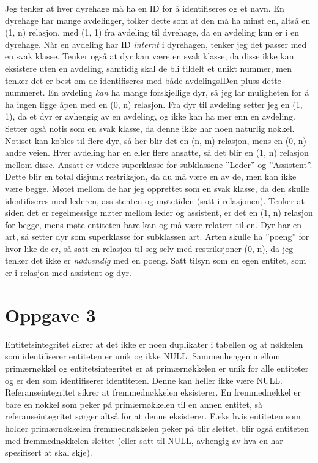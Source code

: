 \documentclass[12pt,a4paper]{article}
\begin{document}
	Jeg tenker at hver dyrehage må ha en ID for å identifiseres og et navn. En dyrehage har mange avdelinger, tolker dette som at den må ha minst en, altså en (1, n) relasjon, med (1, 1) fra avdeling til dyrehage, da en avdeling kun er i en dyrehage. Når en avdeling har ID \textit{internt} i dyrehagen, tenker jeg det passer med en svak klasse. Tenker også at dyr kan være en svak klasse, da disse ikke kan eksistere uten en avdeling, samtidig skal de bli tildelt et unikt nummer, men tenker det er best om de identifiseres med både avdelingsIDen pluss dette nummeret. En avdeling \textit{kan} ha mange forskjellige dyr, så jeg lar muligheten for å ha ingen ligge åpen med en (0, n) relasjon. Fra dyr til avdeling setter jeg en (1, 1), da et dyr er avhengig av en avdeling, og ikke kan ha mer enn en avdeling. Setter også notis som en svak klasse, da denne ikke har noen naturlig nøkkel. Notiset kan kobles til flere dyr, så her blir det en (n, m) relasjon, mens en (0, n) andre veien. Hver avdeling har en eller flere ansatte, så det blir en (1, n) relasjon mellom disse. Ansatt er videre superklasse for subklassene ''Leder'' og ''Assistent''. Dette blir en total disjunk restriksjon, da du må være en av de, men kan ikke være begge. Møtet mellom de har jeg opprettet som en svak klasse, da den skulle identifiseres med lederen, assistenten og møtetiden (satt i relasjonen). Tenker at siden det er regelmessige møter mellom leder og assistent, er det en (1, n) relasjon for begge, mens møte-entiteten bare kan og må være relatert til en. Dyr har en art, så setter dyr som superklasse for subklassen art. Arten skulle ha ''poeng'' for hvor like de er, så satt en relasjon til seg selv med restriksjoner (0, n), da jeg tenker det ikke er \textit{nødvendig} med en poeng. Satt tilsyn som en egen entitet, som er i relasjon med assistent og dyr. 
	
	\section{Oppgave 3}
		Entitetsintegritet sikrer at det ikke er noen duplikater i tabellen og at nøkkelen som identifiserer entiteten er unik og ikke NULL. Sammenhengen mellom primærnøkkel og entitetsintegritet er at primærnøkkelen er unik for alle entiteter og er den som identifiserer identiteten. Denne kan heller ikke være NULL. Referanseintegritet sikrer at fremmednøkkelen eksisterer. En fremmednøkkel er bare en nøkkel som peker på primærnøkkelen til en annen entitet, så referanseintegritet sørger altså for at denne eksisterer. F.eks hvis entiteten som holder primærnøkkelen fremmednøkkelen peker på blir slettet, blir også entiteten med fremmednøkkelen slettet (eller satt til NULL, avhengig av hva en har spesifisert at skal skje).
	
\end{document}
